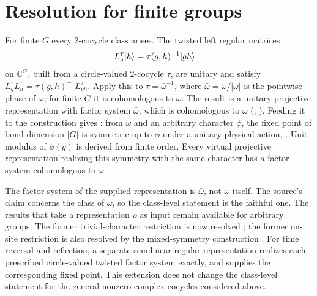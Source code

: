 \documentclass{article}
\begin{document}
\section{Resolution for finite groups}
For finite $G$ every 2-cocycle class arises. The twisted left regular matrices
\begin{align}
    L^{\tau}_g|h\rangle & =\tau(g,h)^{-1}|gh\rangle
    \label{eq:rmp_spt_supplied_twisted_regular}
\end{align}
on $\mathbb C^G$, built from a circle-valued 2-cocycle $\tau$, are unitary and
satisfy $L^{\tau}_gL^{\tau}_h=\tau(g,h)^{-1}L^{\tau}_{gh}$. Apply this to
$\tau=\bar\omega^{-1}$, where $\bar\omega=\omega/|\omega|$ is the pointwise phase of $\omega$; for
finite $G$ it is cohomologous to $\omega$. The result is a unitary projective representation with factor
system $\bar\omega$, which is cohomologous to $\omega$
(,
).
Feeding it to the construction gives
: from $\omega$
and an arbitrary character $\phi$, the fixed point of bond dimension $|G|$
is symmetric up to $\phi$ under a unitary physical action,
. Unit modulus of
$\phi(g)$ is derived from finite order. Every virtual projective
representation realizing this symmetry with the same character has a
factor system cohomologous to $\omega$.

The factor system of the supplied representation is $\bar\omega$, not $\omega$
itself. The source's claim concerns the class of $\omega$, so the class-level
statement is the faithful one. The results that take a representation $\rho$ as
input remain available for arbitrary groups. The former trivial-character
restriction is now resolved \cite{gap:rmp_spt_fixed_point_trivial_character};
the former on-site restriction is also resolved by the mixed-symmetry
construction \cite{gap:rmp_spt_fixed_point_onsite_scope}. For time reversal
and reflection, a separate semilinear regular representation realizes each
prescribed circle-valued twisted factor system exactly, and
 supplies the corresponding
fixed point. This extension does not change the class-level statement for
the general nonzero complex cocycles considered above.



\end{document}
